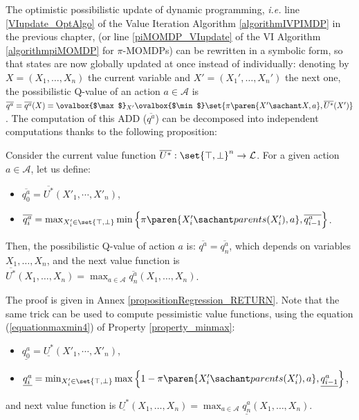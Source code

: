 The optimistic possibilistic update of dynamic programming, 
\emph{i.e.} line \ref{VIupdate_OptAlgo} 
of the Value Iteration Algorithm \ref{algorithmIVPIMDP} 
in the previous chapter,
(or line \ref{piMOMDP_VIupdate} of the VI Algorithm \ref{algorithmpiMOMDP} for $\pi$-MOMDPs)
can be rewritten in a symbolic form, so that states are
now globally updated at once instead of individually: 
denoting by $X=(X_1,\ldots,X_n)$ the current variable
and $X'=(X_1',\ldots,X_n')$ the next one,
the possibilistic Q-value of an action $a \in \mathcal{A}$
is $\overline{q^a} = \overline{q^a}(X)= \ovalbox{$\max$}_{X'} \ovalbox{$\min$} \set{ \pi \paren{ X' \sachant X,a }, \overline{U^*}(X') }$.
The computation of this ADD ($\overline{q^a}$) can be decomposed into independent computations 
thanks to the following proposition:
\begin{Property}
\label{propositionRegression}
Consider the current value function
 $\overline{U^*}: \set{\top,\bot}^n \rightarrow \mathcal{L}$. 
For a given action $a \in \mathcal{A}$, let us define:
\begin{itemize}
\item $\overline{q^a_0} = \overline{U^*}(X'_1,\cdots,X'_n)$, 
\item $\overline{q^a_i} = \max_{X'_i \in \set{\top,\bot}} \min \Big\{ \pi \paren{X_i' \sachant parents(X_i'),a} , \overline{q^a_{i-1}} \Big\}$.
\end{itemize}
Then, the possibilistic Q-value of action $a$ is: $\overline{q^a} = \overline{q^a_n}$,
which depends on variables $X_1,\ldots,X_n$,
and the next value function is $\overline{U^*}(X_1,\ldots,X_n) = \max_{a \in \mathcal{A}} \overline{q^a_n}(X_1,\ldots,X_n)$.
\end{Property}
The proof is given in Annex \ref{propositionRegression_RETURN}.
Note that the same trick can be used to compute 
pessimistic value functions,
using the equation (\ref{equationmaxmin4}) of Property \ref{property_minmax}: 
\begin{itemize}
\item $\underline{q^a_0} = \underline{U^*}(X'_1,\cdots,X'_n)$, 
\item $\underline{q^a_i} = \min_{X'_i \in \set{\top,\bot}} \max \Big\{ 1 - \pi \paren{X_i' \sachant parents(X_i'),a} , \underline{q^a_{i-1}} \Big\}$,
\end{itemize}
and next value function is $\underline{U^*}(X_1,\ldots,X_n) = \max_{a \in \mathcal{A}} \underline{q^a_n}(X_1,\ldots,X_n)$.

